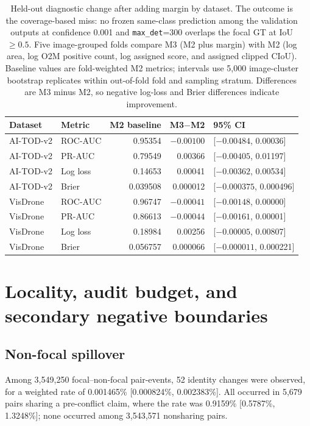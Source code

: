 \documentclass[preprint,10pt]{elsarticle}
\begin{document}
\begin{table}[ht]
\centering
\scriptsize
\caption{Held-out diagnostic change after adding margin by dataset. The outcome is the coverage-based miss: no frozen same-class prediction among the validation outputs at confidence 0.001 and \texttt{max\_det}=300 overlaps the focal GT at IoU $\geq0.5$. Five image-grouped folds compare M3 (M2 plus margin) with M2 (log area, log O2M positive count, log assigned score, and assigned clipped CIoU). Baseline values are fold-weighted M2 metrics; intervals use 5,000 image-cluster bootstrap replicates within out-of-fold fold and sampling stratum. Differences are M3 minus M2, so negative log-loss and Brier differences indicate improvement.}
\begin{tabular}{@{}llrrl@{}}
\toprule
Dataset & Metric & M2 baseline & M3$-$M2 & 95\% CI \\
\midrule
AI-TOD-v2 & ROC-AUC & 0.95354 & $-0.00100$ & [$-0.00484$, 0.00036] \\
AI-TOD-v2 & PR-AUC & 0.79549 & 0.00366 & [$-0.00405$, 0.01197] \\
AI-TOD-v2 & Log loss & 0.14653 & 0.00041 & [$-0.00362$, 0.00534] \\
AI-TOD-v2 & Brier & 0.039508 & 0.000012 & [$-0.000375$, 0.000496] \\
VisDrone & ROC-AUC & 0.96747 & $-0.00041$ & [$-0.00148$, 0.00000] \\
VisDrone & PR-AUC & 0.86613 & $-0.00044$ & [$-0.00161$, 0.00001] \\
VisDrone & Log loss & 0.18984 & 0.00256 & [$-0.00005$, 0.00807] \\
VisDrone & Brier & 0.056757 & 0.000066 & [$-0.000011$, 0.000221] \\
\bottomrule
\end{tabular}
\end{table}

\section{Locality, audit budget, and secondary negative boundaries}

\subsection{Non-focal spillover}

Among 3,549,250 focal--non-focal pair-events, 52 identity changes were observed, for a weighted rate of 0.001465\% [0.000824\%, 0.002383\%]. All occurred in 5,679 pairs sharing a pre-conflict claim, where the rate was 0.9159\% [0.5787\%, 1.3248\%]; none occurred among 3,543,571 nonsharing pairs.
\end{document}
